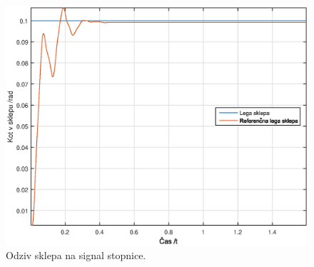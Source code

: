 \begin{figure}[!ht]
	\centering
	\includegraphics[scale=0.5]{./Slike/torque_follow_step.eps}
	\caption{Odziv sklepa na signal stopnice.}
	\label{fig:torque_follow_step}
\end{figure}
